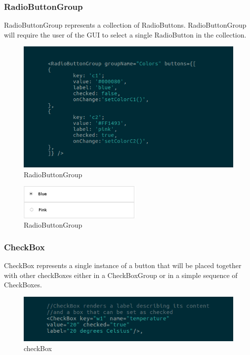 \subsubsection{RadioButtonGroup}
RadioButtonGroup represents a collection of RadioButtons.
RadioButtonGroup will require the user of the GUI to select a single RadioButton in the collection.
\begin{figure}[H]
	\centering
	\includegraphics[width=14cm]{../../documenti/UserManualFramework/framework_view/8framework_view_radio_group.png}
	\caption{RadioButtonGroup}
\end{figure}

\begin{figure}[H]
	\centering
	\includegraphics[width=6cm]{../../documenti/UserManualFramework/graphical_elements/radioButtonGroupGE.png}
	\caption{RadioButtonGroup}
\end{figure}

\subsubsection{CheckBox}
CheckBox represents a single instance of a button that will be placed together with other checkBoxes either in a CheckBoxGroup or in a simple sequence of CheckBoxes.
\begin{figure}[H]
	\centering
	\includegraphics[width=14cm]{../../documenti/UserManualFramework/framework_view/9framework_view_check.png}
	\caption{checkBox}
\end{figure}

